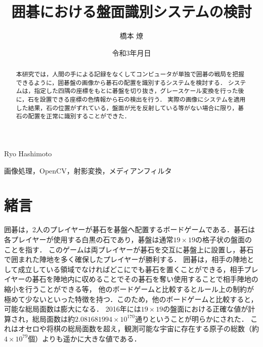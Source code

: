 \documentclass[openright]{nitocs}
\numberwithin{equation}{section}
\begin{document}
    \title{囲碁における盤面識別システムの検討}  %
    \author{橋本 燎}{Ryo Hashimoto} %
    \date{令和3年\number\month 月\number\day 日} %

    \begin{abstract} %
        本研究では，人間の手による記録をなくしてコンピュータが単独で囲碁の戦局を把握できるように，囲碁盤の画像から碁石の配置を識別するシステムを検討する．
        システムは，指定した四隅の座標をもとに碁盤を切り抜き，グレースケール変換を行った後に，石を設置できる座標の色情報から石の検出を行う．
        実際の画像にシステムを適用した結果，石の位置がずれている，盤面が光を反射している等がない場合に限り，碁石の配置を正常に識別することができた．
    \end{abstract}

    \begin{keyword} %
        画像処理，OpenCV，射影変換，メディアンフィルタ
    \end{keyword}


    \maketitle

    \section{緒言}  
    \label{sec:format}
        囲碁は，2人のプレイヤーが碁石を碁盤へ配置するボードゲームである．碁石は各プレイヤーが使用する白黒の石であり，碁盤は通常$19\times19$の格子状の盤面のことを指す．
        このゲームは両プレイヤーが碁石を交互に碁盤上に設置し，碁石で囲まれた陣地を多く確保したプレイヤーが勝利する．
        囲碁は，相手の陣地として成立している領域でなければどこにでも碁石を置くことができる，相手プレイヤーの碁石を陣地内に収めることでその碁石を奪い使用することで相手陣地の縮小を行うことができる等，
        他のボードゲームと比較するとルール上の制約が極めて少ないといった特徴を持つ．このため，他のボードゲームと比較すると，可能な総局面数は膨大になる．
        2016年には$19\times19$の盤面における正確な値が計算され，総局面数は約$2.081681994 \times 10^{170}$通りということが明らかにされた\cite{numbers}．
        これはオセロや将棋の総局面数を超え，観測可能な宇宙に存在する原子の総数（約$4\times10^{79}$個）よりも遥かに大きな値である．
\end{document}
